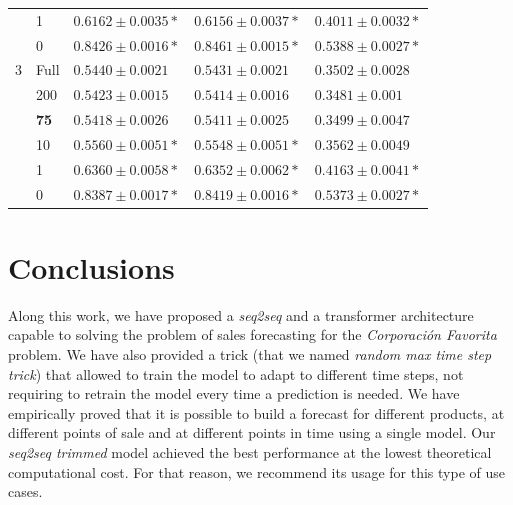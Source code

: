 \documentclass{elsarticle}
\begin{document}
\begin{table}[!h]
\begin{tabular}{lllll}
			       & 1               & $ 0.6162 \pm 0.0035 *$          & $ 0.6156 \pm 0.0037 *$         & $ 0.4011 \pm 0.0032 *$          \\
			       & 0               & $ 0.8426 \pm 0.0016 *$          & $ 0.8461 \pm 0.0015 *$         & $ 0.5388 \pm 0.0027 *$          \\ \hline
			3      & Full            & $ 0.5440 \pm 0.0021 $           & $ 0.5431 \pm 0.0021 $          & $ 0.3502 \pm 0.0028 $          \\
			       & 200             & $ 0.5423 \pm 0.0015 $           & $ 0.5414 \pm 0.0016 $          & $ 0.3481 \pm 0.001 $           \\
			       & \textbf{75}     & $ \mathbf{0.5418 \pm 0.0026} $  & $ \mathbf{0.5411 \pm 0.0025} $ & $ \mathbf{0.3499 \pm 0.0047} $ \\
			       & 10              & $ 0.5560 \pm 0.0051 *$          & $ 0.5548 \pm 0.0051 *$         & $ 0.3562 \pm 0.0049 $          \\
			       & 1               & $ 0.6360 \pm 0.0058 *$          & $ 0.6352 \pm 0.0062 *$         & $ 0.4163 \pm 0.0041 *$          \\
			       & 0               & $ 0.8387 \pm 0.0017 *$          & $ 0.8419 \pm 0.0016 *$         & $ 0.5373 \pm 0.0027 *$          \\ \hline
		\end{tabular}
	\end{table}
	
	\section{Conclusions} \label{sec:conclusions}
	
	Along this work, we have proposed a \textit{seq2seq} and a transformer architecture capable to solving the problem of sales forecasting for the \textit{Corporación Favorita} problem. We have also provided a trick (that we named \textit{random max time step trick}) that allowed to train the model to adapt to different time steps, not requiring to retrain the model every time a prediction is needed. We have empirically proved that it is possible to build a forecast for different products, at different points of sale and at different points in time using a single model. Our \textit{seq2seq trimmed} model achieved the best performance at the lowest theoretical computational cost. For that reason, we recommend its usage for this type of use cases.
\end{document}
